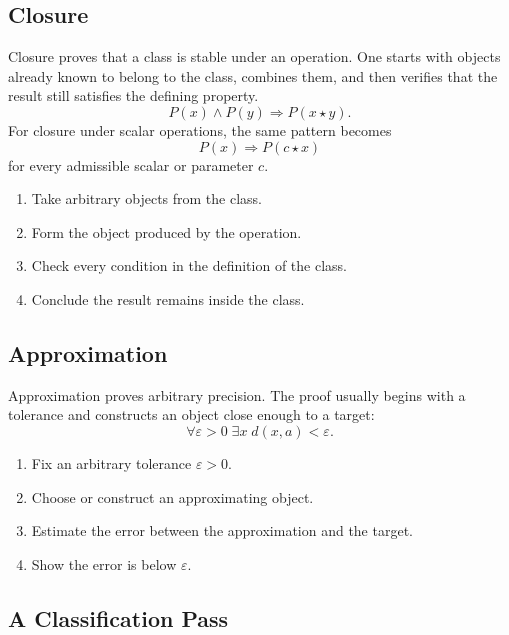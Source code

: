 \subsection*{Closure}
\label{subsec:property-closure}

Closure proves that a class is stable under an operation. One starts with
objects already known to belong to the class, combines them, and then verifies
that the result still satisfies the defining property.
\[
  P(x)\land P(y)\Rightarrow P(x\star y).
\]
For closure under scalar operations, the same pattern becomes
\[
  P(x)\Rightarrow P(c\star x)
\]
for every admissible scalar or parameter $c$.

\begin{remark}
\begin{enumerate}
  \item Take arbitrary objects from the class.
  \item Form the object produced by the operation.
  \item Check every condition in the definition of the class.
  \item Conclude the result remains inside the class.
\end{enumerate}
\end{remark}

\subsection*{Approximation}
\label{subsec:property-approximation}

Approximation proves arbitrary precision. The proof usually begins with a
tolerance and constructs an object close enough to a target:
\[
  \forall\varepsilon>0\;\exists x\;d(x,a)<\varepsilon.
\]

\begin{remark}
\begin{enumerate}
  \item Fix an arbitrary tolerance $\varepsilon>0$.
  \item Choose or construct an approximating object.
  \item Estimate the error between the approximation and the target.
  \item Show the error is below $\varepsilon$.
\end{enumerate}
\end{remark}

\subsection*{A Classification Pass}
\label{subsec:property-classification-pass}

